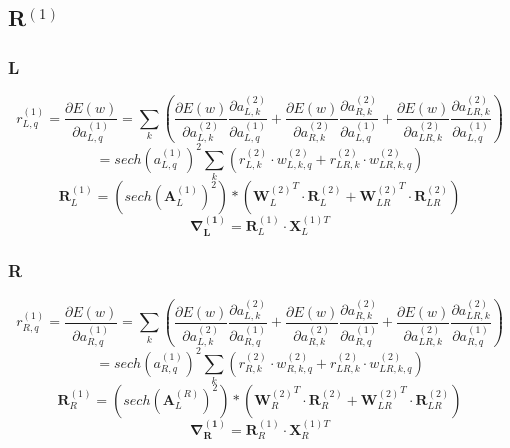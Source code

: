 \documentclass[11pt]{article}
\begin{document}
\subsection*{R$^{(1)}$}
\subsubsection*{L} 
$$r^{(1)}_{L,q} = \frac{\partial E(w)}{\partial a^{(1)}_{L,q}} =\sum_{k} ( \frac{\partial E(w)}{\partial a^{(2)}_{L,k}} \frac{\partial a^{(2)}_{L,k}}{\partial a^{(1)}_{L,q}} + \frac{\partial E(w)}{\partial a^{(2)}_{R,k}} \frac{\partial a^{(2)}_{R,k}}{\partial a^{(1)}_{L,q}} +  \frac{\partial E(w)}{\partial a^{(2)}_{LR,k}} \frac{\partial a^{(2)}_{LR,k}}{\partial a^{(1)}_{L,q}} )$$
$$= sech(a_{L,q}^{(1)})^2 \sum_{k} (r^{(2)}_{L,k}\cdot w_{L,k,q}^{(2)} +r^{(2)}_{LR,k} \cdot w_{LR,k,q}^{(2)}) $$
$$\mathbf{R}^{(1)}_{L} = (sech(\mathbf{A}_{L}^{(1)})^2) * ( {\mathbf{W}_{L}^{(2)}}^T \cdot \mathbf{R}_{L}^{(2)} + {\mathbf{W}_{LR}^{(2)}}^T \cdot \mathbf{R}_{LR}^{(2)}) $$
$$\mathbf{\nabla^{(1)}_L}= \mathbf{R}^{(1)}_L \cdot \mathbf{X}^{(1)T}_L$$
\subsubsection*{R}
$$r^{(1)}_{R,q} = \frac{\partial E(w)}{\partial a^{(1)}_{R,q}} =\sum_{k} ( \frac{\partial E(w)}{\partial a^{(2)}_{L,k}} \frac{\partial a^{(2)}_{L,k}}{\partial a^{(1)}_{R,q}} + \frac{\partial E(w)}{\partial a^{(2)}_{R,k}} \frac{\partial a^{(2)}_{R,k}}{\partial a^{(1)}_{R,q}} +  \frac{\partial E(w)}{\partial a^{(2)}_{LR,k}} \frac{\partial a^{(2)}_{LR,k}}{\partial a^{(1)}_{R,q}} )$$
$$= sech(a_{R,q}^{(1)})^2 \sum_{k} (r^{(2)}_{R,k}\cdot w_{R,k,q}^{(2)} +r^{(2)}_{LR,k} \cdot w_{LR,k,q}^{(2)}) $$
$$\mathbf{R}^{(1)}_{R} = (sech(\mathbf{A}_{L}^{(R)})^2) * ( {\mathbf{W}_{R}^{(2)}}^T \cdot \mathbf{R}_{R}^{(2)} + {\mathbf{W}_{LR}^{(2)}}^T \cdot \mathbf{R}_{LR}^{(2)}) $$
$$\mathbf{\nabla^{(1)}_R}= \mathbf{R}^{(1)}_R \cdot \mathbf{X}^{(1)T}_R$$
\end{document}
